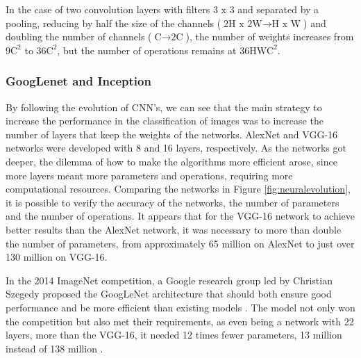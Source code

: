 In the case of two convolution layers with filters $3\text{ x }3$ and separated by a pooling, reducing by half the size of the channels ($\text{2H x 2W} \rightarrow \text{H x W}$) and doubling the number of channels ($\text{C} \rightarrow \text{2C}$), the number of weights increases from $9\text{C}^2$ to $36\text{C}^2$, but the number of operations remains at $36\text{HWC}^2$.

\subsubsection{GoogLenet and Inception} \label{inception}

By following the evolution of CNN's, we can see that the main strategy to increase the performance in the classification of images was to increase the number of layers that keep the weights of the networks. AlexNet and VGG-16 networks were developed with 8 and 16 layers, respectively. As the networks got deeper, the dilemma of how to make the algorithms more efficient arose, since more layers meant more parameters and operations, requiring more computational resources. Comparing the networks in Figure \ref{fig:neuralevolution}, it is possible to verify the accuracy of the networks, the number of parameters and the number of operations. It appears that for the VGG-16 network to achieve better results than the AlexNet network, it was necessary to more than double the number of parameters, from approximately 65 million on AlexNet to just over 130 million on VGG-16.

In the 2014 ImageNet competition, a Google research group led by Christian Szegedy proposed the GoogLeNet architecture that should both ensure good performance and be more efficient than existing models \cite{geron2019}. The model not only won the competition but also met their requirements, as even being a network with 22 layers, more than the VGG-16, it needed 12 times fewer parameters, 13 million instead of 138 million \cite{elgendy2020}.

